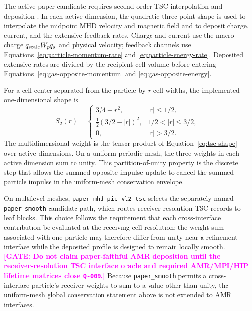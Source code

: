 \documentclass[twocolumn]{aastex701}
\newcommand{\runtime}{\texttt{paper\_mhd\_pic\_vl2\_tsc}\xspace}
\newcommand{\GATE}[1]{\textcolor{magenta}{\textbf{[GATE: #1]}}}
\newcommand{\qgate}[1]{\texttt{#1}}
\begin{document}
The active paper candidate requires second-order TSC interpolation and
deposition \citep{BirdsallLangdon2018}. In each active dimension, the quadratic
three-point shape is used to interpolate the midpoint MHD velocity and magnetic
field and to deposit charge, current, and the extensive feedback rates. Charge
and current use the macro charge $q_{\rm scale}W_pq_s$ and physical velocity;
feedback channels use Equations~\ref{eq:particle-momentum-rate} and
\ref{eq:particle-energy-rate}. Deposited extensive rates are divided by the
recipient-cell volume before entering Equations~\ref{eq:gas-opposite-momentum}
and \ref{eq:gas-opposite-energy}.

For a cell center separated from the particle by $r$ cell widths, the
implemented one-dimensional shape is
\begin{equation}
S_2(r)=
\begin{cases}
3/4-r^2, & |r|\leq 1/2,\\
\frac{1}{2}(3/2-|r|)^2, & 1/2<|r|\leq 3/2,\\
0, & |r|>3/2.
\end{cases}
\label{eq:tsc-shape}
\end{equation}
The multidimensional weight is the tensor product of
Equation~\ref{eq:tsc-shape} over active dimensions. On a uniform periodic
mesh, the three weights in each active dimension sum to unity. This
partition-of-unity property is the discrete step that allows the summed
opposite-impulse update to cancel the summed particle impulse in the
uniform-mesh conservation envelope.

On multilevel meshes, \runtime selects the separately named
\texttt{paper\_smooth} candidate path, which routes receiver-resolution TSC
records to leaf blocks. This choice follows the requirement that each
cross-interface contribution be evaluated at the receiving-cell resolution;
the weight sum associated with one particle may therefore differ from unity
near a refinement interface while the deposited profile is designed to remain
locally smooth.
\GATE{Do not claim paper-faithful AMR deposition until the receiver-resolution
TSC interface oracle and required AMR/MPI/HIP lifetime matrices close
\qgate{Q-009}.}
Because \texttt{paper\_smooth} permits a cross-interface particle's receiver
weights to sum to a value other than unity, the uniform-mesh global
conservation statement above is not extended to AMR interfaces.
\end{document}
